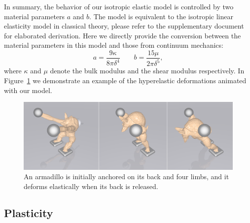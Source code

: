 In summary, the behavior of our isotropic elastic model is controlled by two material parameters $a$ and $b$. The model is equivalent to the isotropic linear elasticity model in classical theory, please refer to the supplementary document for elaborated derivation. Here we directly provide the conversion between the material parameters in this model and those from continuum mechanics:
\begin{equation}
a = \frac{9\kappa}{8\pi\delta^4} \qquad b = \frac{15\mu}{2\pi\delta^5},
\label{eq:9}
\end{equation}
where $\kappa$ and $\mu$ denote the bulk modulus and the shear modulus respectively. In Figure~\ref{fig:3} we demonstrate an example of the hyperelastic deformations animated with our model.
\begin{figure}[t]
  \centering
  \includegraphics[width=\linewidth]{../figs/demo_pull_armadillo.png}
  \caption{\label{fig:3}
  An armadillo is initially anchored on its back and four limbs, and it deforms elastically when its back is released.
}
\end{figure}

\subsection{Plasticity}


